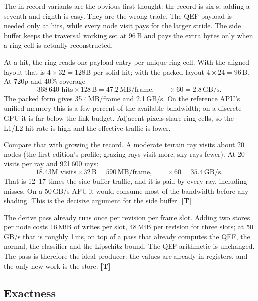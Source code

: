 \documentclass[11pt,a4paper]{article}
\newcommand{\evT}{\textsf{\textbf{\color{evT}[T]}}}
\newcommand{\code}[1]{\texttt{\detokenize{#1}}}
\theoremstyle{plain}
\theoremstyle{definition}
\theoremstyle{remark}
\begin{document}
The in-record variants are the obvious first thought: the record is six
\code{vec4}s; adding a seventh and eighth is easy. They are the wrong trade.
The QEF payload is needed only at hits, while every node visit pays for the
larger stride. The side buffer keeps the traversal working set at 96\,B and
pays the extra bytes only when a ring cell is actually reconstructed.

At a hit, the ring reads one payload entry per unique ring cell. With the
aligned layout that is $4\times32=128$\,B per solid hit; with the packed layout
$4\times24=96$\,B. At 720p and 40\% coverage:
\begin{equation}
368\,640\text{ hits}\times128\,\text{B}=47.2\,\text{MB/frame},\qquad
\times60=2.8\,\text{GB/s}.
\end{equation}
The packed form gives 35.4\,MB/frame and 2.1\,GB/s. On the reference APU's
unified memory this is a few percent of the available bandwidth; on a discrete
GPU it is far below the link budget. Adjacent pixels share ring cells, so the
L1/L2 hit rate is high and the effective traffic is lower.

Compare that with growing the record. A moderate terrain ray visits about 20
nodes (the first edition's profile; grazing rays visit more, sky rays fewer).
At 20 visits per ray and 921\,600 rays:
\begin{equation}
18.43\text{M visits}\times32\,\text{B}=590\,\text{MB/frame},\qquad
\times60=35.4\,\text{GB/s}.
\end{equation}
That is 12--17 times the side-buffer traffic, and it is paid by every ray,
including misses. On a 50\,GB/s APU it would consume most of the bandwidth
before any shading. This is the decisive argument for the side buffer.
\evT

The derive pass already runs once per revision per frame slot. Adding two
\code{vec4} stores per node costs 16\,MiB of writes per slot, 48\,MiB per
revision for three slots; at 50\,GB/s that is roughly 1\,ms, on top of a pass
that already computes the QEF, the normal, the classifier and the Lipschitz
bound. The QEF arithmetic is unchanged. The pass is therefore the ideal
producer: the values are already in registers, and the only new work is the
store. \evT

\subsection{Exactness}
\end{document}

